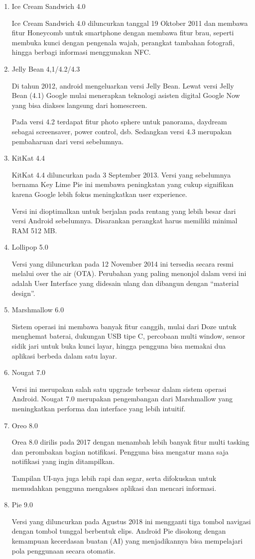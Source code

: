 \begin{enumerate}
\item Ice Cream Sandwich 4.0
\par Ice Cream Sandwich 4.0 diluncurkan tanggal 19 Oktober 2011 dan membawa fitur Honeycomb untuk smartphone dengan membawa fitur brau, seperti membuka kunci dengan pengenala wajah, perangkat tambahan fotografi, hingga berbagi informasi menggunakan NFC.
\item Jelly Bean 4,1/4.2/4.3
\par Di tahun 2012, android mengeluarkan versi Jelly Bean. Lewat versi Jelly Bean (4.1) Google mulai menerapkan teknologi asisten digital Google Now yang bisa diakses langsung dari homescreen.

\par Pada versi 4.2 terdapat fitur photo sphere untuk panorama, daydream sebagai screensaver, power control, dsb. Sedangkan versi 4.3 merupakan pembaharuan dari versi sebelumnya.
\item KitKat 4.4
\par KitKat 4.4 diluncurkan pada 3 September 2013. Versi yang sebelumnya bernama Key Lime Pie ini membawa peningkatan yang cukup signifikan karena Google lebih fokus meningkatkan user experience.

\par Versi ini dioptimalkan untuk berjalan pada rentang yang lebih besar dari versi Android sebelumnya. Disarankan perangkat harus memiliki minimal RAM 512 MB.

\item Lollipop 5.0
\par Versi yang diluncurkan pada 12 November 2014 ini tersedia secara resmi melalui over the air (OTA). Perubahan yang paling menonjol dalam versi ini adalah User Interface yang didesain ulang dan dibangun dengan “material design”.
\item Marshmallow 6.0
\par Sistem operasi ini membawa banyak fitur canggih, mulai dari Doze untuk menghemat baterai, dukungan USB tipe C, percobaan multi window, sensor sidik jari untuk buka kunci layar, hingga pengguna bisa memakai dua aplikasi berbeda dalam satu layar.
\item Nougat 7.0
\par Versi ini merupakan salah satu upgrade terbesar dalam sistem operasi Android. Nougat 7.0 merupakan pengembangan dari Marshmallow yang meningkatkan performa dan interface yang lebih intuitif.
\item Oreo 8.0
\par Orea 8.0 dirilis pada 2017 dengan menambah lebih banyak fitur multi tasking dan perombakan bagian notifikasi. Pengguna bisa mengatur mana saja notifikasi yang ingin ditampilkan.

\par Tampilan UI-nya juga lebih rapi dan segar, serta difokuskan untuk memudahkan pengguna mengakses aplikasi dan mencari informasi.
\item Pie 9.0
\par Versi yang diluncurkan pada Agustus 2018 ini mengganti tiga tombol navigasi dengan tombol tunggal berbentuk elips. Android Pie disokong dengan kemampuan kecerdasan buatan (AI) yang menjadikannya bisa mempelajari pola penggunaan secara otomatis.
\end{enumerate}